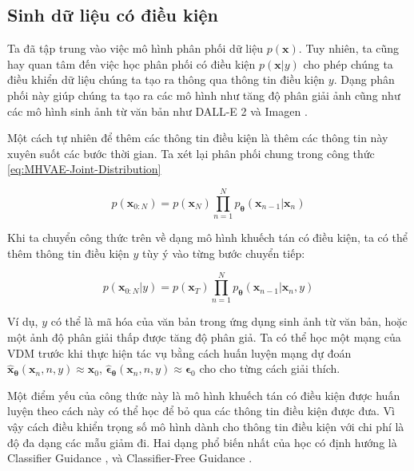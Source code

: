 \documentclass[14pt, a4paper]{article}
\numberwithin{equation}{section}
\numberwithin{figure}{section}
\numberwithin{dl}{section}
\numberwithin{md}{section}
\numberwithin{bd}{section}
\numberwithin{dn}{section}
\numberwithin{hq}{section}
\begin{document}
    \subsection{Sinh dữ liệu có điều kiện}

    Ta đã tập trung vào việc mô hình phân phối dữ liệu $p(\boldsymbol{x})$.
    Tuy nhiên, ta cũng hay quan tâm đến việc học phân phối có điều kiện $p(\boldsymbol{x} \vert y)$ cho phép chúng ta điều khiển dữ liệu chúng ta tạo ra thông qua thông tin điều kiện $y$.
    Dạng phân phối này giúp chúng ta tạo ra các mô hình như tăng độ phân giải ảnh \cite{ho2022cascaded} cũng như các mô hình sinh ảnh từ văn bản như DALL-E 2 \cite{ramesh2022hierarchical} và Imagen \cite{saharia2021image}.

    Một cách tự nhiên để thêm các thông tin điều kiện là thêm các thông tin này xuyên suốt các bước thời gian.
    Ta xét lại phân phối chung trong công thức \ref{eq:MHVAE-Joint-Distribution}

    \begin{equation*}
        p(\boldsymbol{x}_{0:N}) = p(\boldsymbol{x}_N) \prod_{n=1}^N p_{\boldsymbol{\theta}} (\boldsymbol{x}_{n-1} \vert \boldsymbol{x}_n)
    \end{equation*}

    Khi ta chuyển công thức trên về dạng mô hình khuếch tán có điều kiện, ta có thể thêm thông tin điều kiện $y$ tùy ý vào từng bước chuyển tiếp:

    \begin{equation}
        p(\boldsymbol{x}_{0:N} \vert y) = p(\boldsymbol{x}_T) \prod_{n=1}^N p_{\boldsymbol{\theta}} (\boldsymbol{x}_{n-1} \vert \boldsymbol{x}_n, y)
    \end{equation}

    Ví dụ, $y$ có thể là mã hóa của văn bản trong ứng dụng sinh ảnh từ văn bản, hoặc một ảnh độ phân giải thấp được tăng độ phân giả.
    Ta có thể học một mạng của VDM trước khi thực hiện tác vụ bằng cách huấn luyện mạng dự đoán $\hat{\boldsymbol{x}}_{\boldsymbol{\theta}} (\boldsymbol{x}_n, n, y) \approx \boldsymbol{x}_0$, $\hat{\boldsymbol{\epsilon}}_{\boldsymbol{\theta}} (\boldsymbol{x}_n, n, y) \approx \boldsymbol{\epsilon}_0$ cho cho từng cách giải thích.

    Một điểm yếu của công thức này là mô hình khuếch tán có điều kiện được huấn luyện theo cách này có thể học để bỏ qua các thông tin điều kiện được đưa.
    Vì vậy cách điều khiển trọng số mô hình dành cho thông tin điều kiện với chi phí là độ đa dạng các mẫu giảm đi.
    Hai dạng phổ biến nhất của học có định hướng là Classifier Guidance \cite{song2020score}, \cite{dhariwal2021diffusion} và Classifier-Free Guidance \cite{ho2021classifier}.
\end{document}

